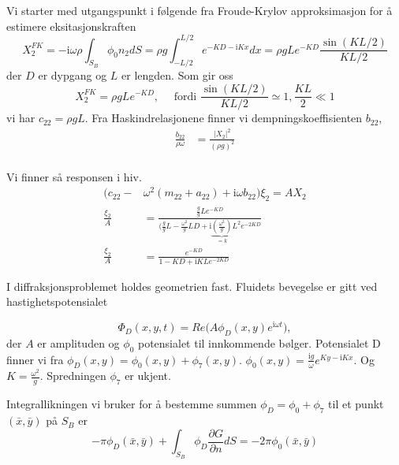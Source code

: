 \documentclass{beamer}
\begin{document}
\begin{frame}
Vi starter med utgangspunkt i følgende fra Froude-Krylov approksimasjon for å estimere eksitasjonskraften %
\begin{equation}
	X_2^{FK} = - \mathrm{i} \omega \rho \int_{S_B} \phi_0 n_2 dS =\rho g \int_{-L/2}^{L/2} e^{-KD- \mathrm{i}Kx} dx = \rho g L e^{-KD} \frac{\sin(KL/2)}{KL/2} 
\end{equation}
der $D$ er dypgang og $L$ er lengden. 
Som gir oss
\begin{equation} X_2^{FK} 
 = \rho g L e^{-KD} , \quad \text{ fordi } \frac{\sin(KL/2)}{KL/2} \simeq 1,  \frac{KL}{2} \ll 1
\end{equation}
vi har 
$c_{22} = \rho g L$.
Fra Haskindrelasjonene finner vi dempningskoeffisienten $b_{22}$,
\begin{align}
	 \frac{b_{22}}{\rho \omega} &= \frac{|X_2|^2 }{(\rho g)^2}\\
\end{align}

Vi finner så responsen i hiv. 
\begin{align}
	(c_{22} - &\omega^2(m_{22} + a_{22}) + \mathrm{i}\omega b_{22})\xi_2 = AX_2\\
	 \frac{\xi_{2}}{A} &= \frac{ \frac{g}{g} L e^{-KD} }{( \frac{g}{g} L -  \frac{\omega^2}{g}L D + \mathrm{i}\underbrace{(\frac{\omega^2}{g})}_{=k} L^2 e^{-2KD} }\\
	 \frac{\xi_{2}}{A} &= \frac{ e^{-KD}}{ 1 - K  D + \mathrm{i} K {L} e^{-2KD} }
\end{align}
\end{frame}

\begin{frame}
I diffraksjonsproblemet holdes geometrien fast. Fluidets bevegelse er gitt ved hastighetspotensialet

\begin{equation}
\Phi_D(x,y,t) = Re\Big(A  \phi_D(x,y) e^{\mathrm{i} \omega t} \Big), 
\end{equation}
der $A$ er amplituden og $\phi_0$ potensialet til innkommende bølger. Potensialet D finner vi fra $\phi_D(x,y) =  \phi_0(x,y) +  \phi_7(x,y)$. 
$\phi_0(x,y) = \frac{\mathrm{i} g}{\omega}e^{Ky -\mathrm{i} K x}$. Og $K = \frac{\omega^2}{g}$. Spredningen $\phi_7$ er ukjent.

Integrallikningen vi bruker for å bestemme summen $\phi_D =  \phi_0 +  \phi_7$ til et punkt $(\bar{x},\bar{y})$ på $S_B$ er
\begin{equation}
    -\pi \phi_D(\bar{x},\bar{y})  + \int_{S_B}   \phi_D  \frac{\partial G }{\partial n}dS = -2\pi \phi_0(\bar{x},\bar{y}) 
\end{equation}
\end{frame}
\end{document}
